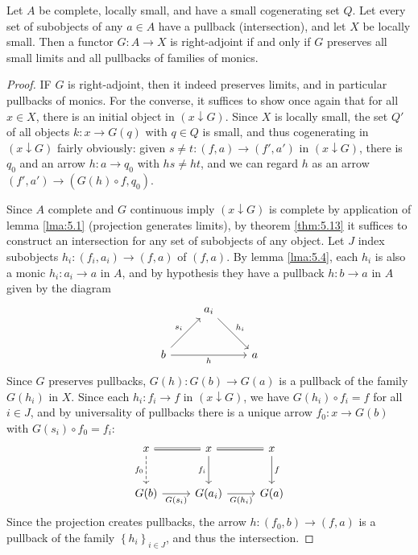\begin{theorem}\label{thm:5.14}
	Let $A$ be complete, locally small, and have a small cogenerating set $Q$. Let every set of subobjects of any $a\in A$ have a pullback (intersection), and let $X$ be locally small. Then a functor $G : A \to X$ is right-adjoint if and only if $G$ preserves all small limits and all pullbacks of families of monics.
\end{theorem}
\begin{proof}
	IF $G$ is right-adjoint, then it indeed preserves limits, and in particular pullbacks of monics. For the converse, it suffices to show once again that for all $x\in X$, there is an initial object in $(x\downarrow G)$. Since $X$ is locally small, the set $Q'$ of all objects $k : x \to G(q)$ with $q\in Q$ is small, and thus cogenerating in $(x\downarrow G)$ fairly obviously: given $s\neq t : (f,a) \to (f',a')$ in $(x\downarrow G)$, there is $q_0$ and an arrow $h: a\to q_0$ with $hs\neq ht$, and we can regard $h$ as an arrow $(f',a')\to (G(h)\circ f,q_0)$.

	Since $A$ complete and $G$ continuous imply $(x\downarrow G)$ is complete by application of lemma \ref{lma:5.1} (projection generates limits), by theorem \ref{thm:5.13} it suffices to construct an intersection for any set of subobjects of any object. Let $J$ index subobjects $h_i : (f_i,a_i) \to (f,a)$ of $(f,a)$. By lemma \ref{lma:5.4}, each $h_i$ is also a monic $h_i : a_i \to a$ in $A$, and by hypothesis they have a pullback $h : b \to a$ in $A$ given by the diagram
	\[\begin{tikzcd}[row sep = 2.5em, column sep = 2.5em]
	 & a_i \ar[" h_i ", dr]  &  \\
	b \ar[" s_i ", ur] \ar[" h "', rr]  &  & a
	\end{tikzcd}\]
	Since $G$ preserves pullbacks, $G(h): G(b) \to G(a)$ is a pullback of the family $G(h_i)$ in $X$. Since each $h_i : f_i \to f$ in $(x\downarrow G)$, we have $G(h_i)\circ f_i=f$ for all $i\in J$, and by universality of pullbacks there is a unique arrow $f_0: x \to G(b)$ with $G(s_i)\circ f_0=f_i$:
	\[\begin{tikzcd}[row sep = 2.5em, column sep = 2.5em]
	x\ar[" f_0 "', dashed, d] \ar[equals, r]  & x\ar[" f_i "', d] \ar[equals, r]  & x\ar[" f ", d]  \\
	G(b)\ar[" G(s_i) "', r]  & G(a_i)\ar[" G(h_i) "', r]  & G(a)
	\end{tikzcd}\]
	Since the projection creates pullbacks, the arrow $h : (f_0,b) \to (f,a)$ is a pullback of the family $\left\{ h_i \right\}_{i\in J} $, and thus the intersection.
\end{proof}

